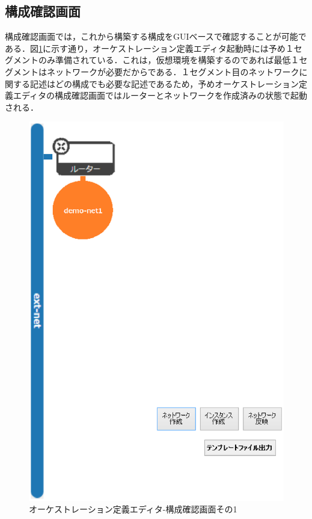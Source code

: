 \documentclass[mingoth]{kut-paper}		%
\begin{document}
		\subsection{構成確認画面}
		構成確認画面では，これから構築する構成をGUIベースで確認することが可能である．図\ref{pic:1}に示す通り，オーケストレーション定義エディタ起動時には予め１セグメントのみ準備されている．これは，仮想環境を構築するのであれば最低１セグメントはネットワークが必要だからである．１セグメント目のネットワークに関する記述はどの構成でも必要な記述であるため，予めオーケストレーション定義エディタの構成確認画面ではルーターとネットワークを作成済みの状態で起動される．
		
		\begin{figure}[h]
			\begin{center}
				\includegraphics[scale=0.55]{Document/構成確認画面１.eps}
				\caption{オーケストレーション定義エディタ-構成確認画面その1}
				\label{pic:1}
			\end{center}
		\end{figure}
\end{document}
